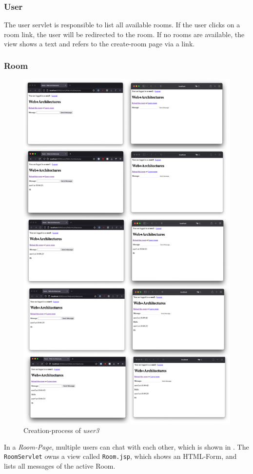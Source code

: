 \subsubsection{User}\label{subsubsec:03_impl_servlets_user}
The user servlet is responsible to list all available rooms. If the user clicks on a room link, the user will be redirected to the room.
If no rooms are available, the view shows a text and refers to the create-room page via a link. 


\subsubsection{Room}\label{subsubsec:03_impl_servlets_room}
\begin{figure}[h]
\centering
\includegraphics[scale=0.3]{images/03_impl/room/chat_all_steps}
\caption{Creation-process of \textit{user3}}
\label{fig:03_impl_servlets_admin_chat}
\end{figure}
In a \textit{Room-Page}, multiple users can chat with each other, which is shown in .
The \texttt{RoomServlet} owns a view called \texttt{Room.jsp}, which shows an HTML-Form, and lists all messages of the active Room.


